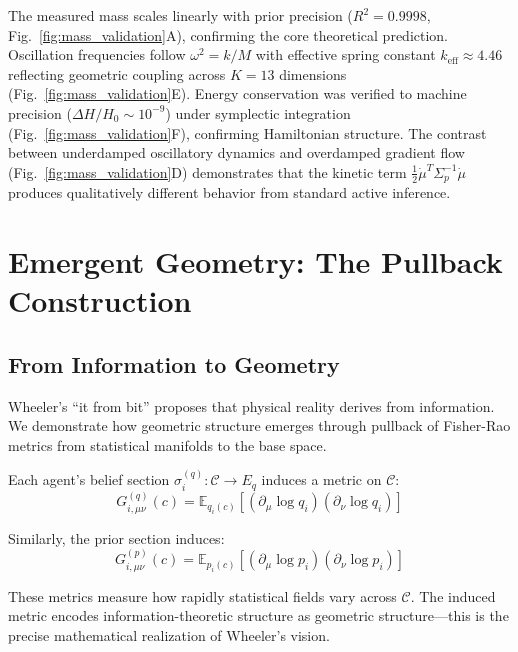 \documentclass[11pt]{article}
\begin{document}
The measured mass scales linearly with prior precision ($R^2 = 0.9998$, Fig.~\ref{fig:mass_validation}A), confirming the core theoretical prediction. Oscillation frequencies follow $\omega^2 = k/M$ with effective spring constant $k_{\text{eff}} \approx 4.46$ reflecting geometric coupling across $K=13$ dimensions (Fig.~\ref{fig:mass_validation}E). Energy conservation was verified to machine precision ($\Delta H/H_0 \sim 10^{-9}$) under symplectic integration (Fig.~\ref{fig:mass_validation}F), confirming Hamiltonian structure. The contrast between underdamped oscillatory dynamics and overdamped gradient flow (Fig.~\ref{fig:mass_validation}D) demonstrates that the kinetic term $\frac{1}{2}\dot{\mu}^T\Sigma_p^{-1}\dot{\mu}$ produces qualitatively different behavior from standard active inference.

\section{Emergent Geometry: The Pullback Construction}
\label{sec:pullback}

\subsection{From Information to Geometry}

Wheeler's ``it from bit'' proposes that physical reality derives from information. We demonstrate how geometric structure emerges through pullback of Fisher-Rao metrics from statistical manifolds to the base space.

Each agent's belief section $\sigma_i^{(q)}: \mathcal{C} \to E_q$ induces a metric on $\mathcal{C}$:
\begin{equation}
\boxed{G^{(q)}_{i,\mu\nu}(c) = \mathbb{E}_{q_i(c)}\left[(\partial_\mu\log q_i)(\partial_\nu\log q_i)\right]}
\label{eq:pullback_belief}
\end{equation}

Similarly, the prior section induces:
\begin{equation}
\boxed{G^{(p)}_{i,\mu\nu}(c) = \mathbb{E}_{p_i(c)}\left[(\partial_\mu\log p_i)(\partial_\nu\log p_i)\right]}
\label{eq:pullback_prior}
\end{equation}

These metrics measure how rapidly statistical fields vary across $\mathcal{C}$. The induced metric encodes information-theoretic structure as geometric structure---this is the precise mathematical realization of Wheeler's vision.
\end{document}
